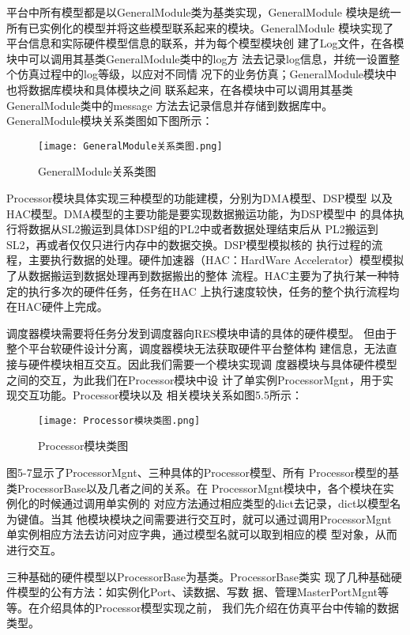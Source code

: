 平台中所有模型都是以GeneralModule类为基类实现，GeneralModule
模块是统一所有已实例化的模型并将这些模型联系起来的模块。GeneralModule
模块实现了平台信息和实际硬件模型信息的联系，并为每个模型模块创
建了Log文件，在各模块中可以调用其基类GeneralModule类中的log方
法去记录log信息，并统一设置整个仿真过程中的log等级，以应对不同情
况下的业务仿真；GeneralModule模块中也将数据库模块和具体模块之间
联系起来，在各模块中可以调用其基类GeneralModule类中的message
方法去记录信息并存储到数据库中。GeneralModule模块关系类图如下图所示：

\begin{figure}
    \centering
    \texttt{[image: GeneralModule关系类图.png]}
    \caption{GeneralModule关系类图}
    \label{fig:badge}
\end{figure}

Processor模块具体实现三种模型的功能建模，分别为DMA模型、DSP模型
以及HAC模型。DMA模型的主要功能是要实现数据搬运功能，为DSP模型中
的具体执行将数据从SL2搬运到具体DSP组的PL2中或者数据处理结束后从
PL2搬运到SL2，再或者仅仅只进行内存中的数据交换。DSP模型模拟核的
执行过程的流程，主要执行数据的处理。硬件加速器（HAC：HardWare 
Accelerator）模型模拟了从数据搬运到数据处理再到数据搬出的整体
流程。HAC主要为了执行某一种特定的执行多次的硬件任务，任务在HAC
上执行速度较快，任务的整个执行流程均在HAC硬件上完成。

调度器模块需要将任务分发到调度器向RES模块申请的具体的硬件模型。
但由于整个平台软硬件设计分离，调度器模块无法获取硬件平台整体构
建信息，无法直接与硬件模块相互交互。因此我们需要一个模块实现调
度器模块与具体硬件模型之间的交互，为此我们在Processor模块中设
计了单实例ProcessorMgnt，用于实现交互功能。Processor模块以及
相关模块关系如图5.5所示：

\begin{figure}[!h]
    \centering
    \texttt{[image: Processor模块类图.png]}
    \caption{Processor模块类图}
    \label{fig:badge}
\end{figure}

图5-7显示了ProcessorMgnt、三种具体的Processor模型、所有
Processor模型的基类ProcessorBase以及几者之间的关系。在
ProcessorMgnt模块中，各个模块在实例化的时候通过调用单实例的
对应方法通过相应类型的dict去记录，dict以模型名为键值。当其
他模块模块之间需要进行交互时，就可以通过调用ProcessorMgnt
单实例相应方法去访问对应字典，通过模型名就可以取到相应的模
型对象，从而进行交互。

三种基础的硬件模型以ProcessorBase为基类。ProcessorBase类实
现了几种基础硬件模型的公有方法：如实例化Port、读数据、写数
据、管理MasterPortMgnt等等。在介绍具体的Processor模型实现之前，
我们先介绍在仿真平台中传输的数据类型。

